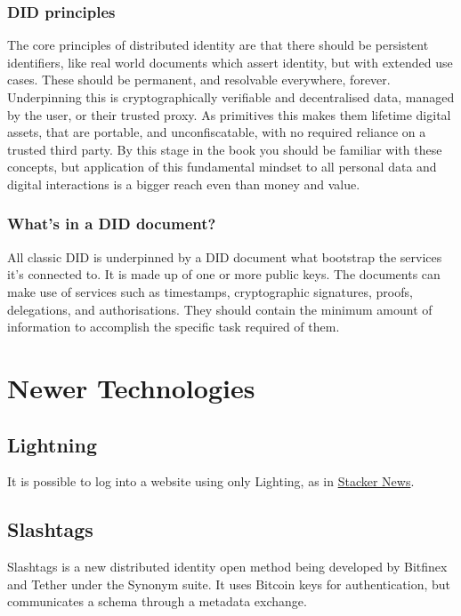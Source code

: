 \subsubsection{DID principles}
The core principles of distributed identity are that there should be persistent identifiers, like real world documents which assert identity, but with extended use cases. These should be permanent, and resolvable everywhere, forever. Underpinning this is cryptographically verifiable and decentralised data, managed by the user, or their trusted proxy. As primitives this makes them lifetime digital assets, that are portable, and unconfiscatable, with no required reliance on a trusted third party. By this stage in the book you should be familiar with these concepts, but application of this fundamental mindset to all personal data and digital interactions is a bigger reach even than money and value.
\subsubsection{What's in a DID document?}
All classic DID is underpinned by a DID document what bootstrap the services it's connected to. It is made up of one or more public keys. The documents can make use of services such as timestamps, cryptographic signatures, proofs, delegations, and authorisations. They should contain the minimum amount of information to accomplish the specific task required of them.

\section{Newer Technologies}

\subsection{Lightning}
It is possible to log into a website using only Lighting, as in \href{https://stacker.news/login?callbackUrl=https://stacker.news/}{Stacker News}.
\subsection{Slashtags}
Slashtags is a new distributed identity open method being developed by Bitfinex and Tether under the Synonym suite. It uses Bitcoin keys for authentication, but communicates a schema through a metadata exchange.
